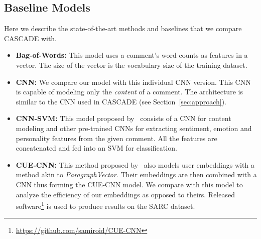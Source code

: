 \documentclass[11pt]{article}
\begin{document}
{\subsection{Baseline Models} \label{sec:baselines}
Here we describe the state-of-the-art methods and baselines that we compare CASCADE with. 
\begin{itemize}[leftmargin=*,noitemsep]
	\item \textbf{Bag-of-Words:} This model uses a comment's word-counts as features in a vector. The size of the vector is the vocabulary size of the training dataset.
	\item \textbf{CNN:} We compare our model with this individual CNN version. This CNN is capable of modeling only the \textit{content} of a comment. The architecture is similar to the CNN used in CASCADE (see Section~\ref{sec:approach}).
    \item \textbf{CNN-SVM:} This model proposed by~ consists of a CNN for content modeling and other pre-trained CNNs for extracting sentiment, emotion and personality features from the given comment. All the features are concatenated and fed into an SVM for classification. 
     \item \textbf{CUE-CNN:} This method proposed by~ also models user embeddings with a method akin to \textit{ParagraphVector}. Their embeddings are then combined with a CNN thus forming the CUE-CNN model. We compare with this model to analyze the efficiency of our embeddings as opposed to theirs. Released software\footnote{\protect\url{https://github.com/samiroid/CUE-CNN}} is used to produce results on the SARC dataset.
\end{itemize}

 
}
\end{document}
